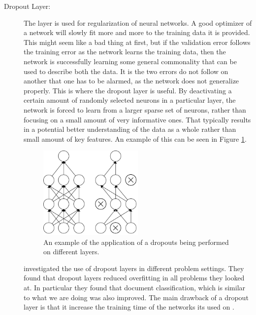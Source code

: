 \begin{description}
    \item[Dropout Layer:]

        The layer is used for regularization of neural networks. A good
        optimizer of a network will slowly fit more and more to the training
        data it is provided. This might seem like a bad thing at first, but if
        the validation error follows the training error as the network learns
        the training data, then the network is successfully learning some
        general commonality that can be used to describe both the data. It is
        the two errors do not follow on another that one has to be alarmed, as
        the network does not generalize properly. This is where the dropout
        layer is useful. By deactivating a certain amount of randomly selected
        neurons in a particular layer, the network is forced to learn from a
        larger sparse set of neurons, rather than focusing on a small amount
        of very informative ones. That typically results in a potential better
        understanding of the data as a whole rather than small amount of key
        features. An example of this can be seen in Figure \ref{fig:dropout}.

        \begin{figure}
            \centering
            \includegraphics[width=0.5\textwidth]{./pictures/method/dropout}
            \caption{An example of the application of a dropouts being performed
                on different layers.}
            \label{fig:dropout}
        \end{figure}

        \citet{JMLR:v15:srivastava14a} investigated the use of dropout
        layers in different problem settings. They found that dropout layers
        reduced overfitting in all problems they looked at. In particular
        they found that document classification, which is similar to what we
        are doing was also improved. The main drawback of a dropout layer
        is that it increase the training time of the networks its used on
        \citep{JMLR:v15:srivastava14a}.

\end{description}


